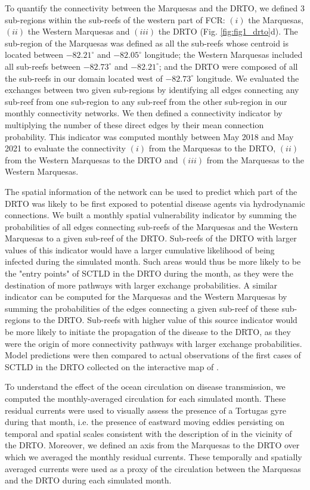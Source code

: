 To quantify the connectivity between the Marquesas and the DRTO, we defined 3 sub-regions within the sub-reefs of the western part of FCR: $(i)$ the Marquesas, $(ii)$ the Western Marquesas and $(iii)$ the DRTO (Fig. \ref{fig:fig1_drto}d). The sub-region of the Marquesas was defined as all the sub-reefs whose centroid is located between $-82.21^\circ$ and $-82.05^\circ$ longitude; the Western Marquesas included all sub-reefs between $-82.73^\circ$ and $-82.21^\circ$; and the DRTO were composed of  all the sub-reefs in our domain located west of $-82.73^\circ$ longitude. We evaluated the exchanges between two given sub-regions by identifying all edges connecting any sub-reef from one sub-region to any sub-reef from the other sub-region in our monthly connectivity networks. We then defined a connectivity indicator by multiplying the number of these direct edges by their mean connection probability. This indicator was computed monthly between May 2018 and May 2021 to evaluate the connectivity $(i)$ from the Marquesas to the DRTO, $(ii)$ from the Western Marquesas to the DRTO and $(iii)$ from the Marquesas to the Western Marquesas.

The spatial information of the network can be used to predict which part of the DRTO was likely to be first exposed to potential disease agents via hydrodynamic connections. We built a monthly spatial vulnerability indicator by summing the probabilities of all edges connecting sub-reefs of the Marquesas and the Western Marquesas to a given sub-reef of the DRTO. Sub-reefs of the DRTO with larger values of this indicator would have a larger cumulative likelihood of being infected during the simulated month. Such areas would thus be more likely to be the "entry points" of SCTLD in the DRTO during the month, as they were the destination of more pathways with larger exchange probabilities. A similar indicator can be computed for the Marquesas and the Western Marquesas by summing the probabilities of the edges connecting a given sub-reef of these sub-regions to the DRTO. Sub-reefs with higher value of this source indicator would be more likely to initiate the propagation of the disease to the DRTO, as they were the origin of more connectivity pathways with larger exchange probabilities. Model predictions were then compared to actual observations of the first cases of SCTLD in the DRTO collected on the interactive map of \cite{kramer2019map}. 

To understand the effect of the ocean circulation on disease transmission, we computed the monthly-averaged circulation for each simulated month. These residual currents were used to visually assess the presence of a Tortugas gyre during that month, i.e. the presence of eastward moving eddies persisting on temporal and spatial scales consistent with the description of \cite{lee1994evolution} in the vicinity of the DRTO. Moreover, we defined an axis from the Marquesas to the DRTO over which we averaged the monthly residual currents. These temporally and spatially averaged currents were used as a proxy of the circulation between the Marquesas and the DRTO during each simulated month.

